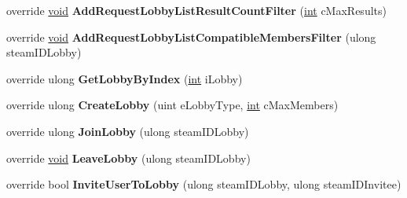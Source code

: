 \begin{DoxyCompactItemize}
\item 
\hypertarget{classValve_1_1Steamworks_1_1CSteamMatchmaking_a8fa5cee5cad857513eefb6151200ac21}{}override \hyperlink{SDL__audio_8h_a52835ae37c4bb905b903cbaf5d04b05f}{void} {\bfseries Add\+Request\+Lobby\+List\+Result\+Count\+Filter} (\hyperlink{SDL__thread_8h_a6a64f9be4433e4de6e2f2f548cf3c08e}{int} c\+Max\+Results)\label{classValve_1_1Steamworks_1_1CSteamMatchmaking_a8fa5cee5cad857513eefb6151200ac21}

\item 
\hypertarget{classValve_1_1Steamworks_1_1CSteamMatchmaking_a04ee4ec68751ead938cf98fcc8730def}{}override \hyperlink{SDL__audio_8h_a52835ae37c4bb905b903cbaf5d04b05f}{void} {\bfseries Add\+Request\+Lobby\+List\+Compatible\+Members\+Filter} (ulong steam\+I\+D\+Lobby)\label{classValve_1_1Steamworks_1_1CSteamMatchmaking_a04ee4ec68751ead938cf98fcc8730def}

\item 
\hypertarget{classValve_1_1Steamworks_1_1CSteamMatchmaking_a315830b2eb4fe823ce9c5bff328755d9}{}override ulong {\bfseries Get\+Lobby\+By\+Index} (\hyperlink{SDL__thread_8h_a6a64f9be4433e4de6e2f2f548cf3c08e}{int} i\+Lobby)\label{classValve_1_1Steamworks_1_1CSteamMatchmaking_a315830b2eb4fe823ce9c5bff328755d9}

\item 
\hypertarget{classValve_1_1Steamworks_1_1CSteamMatchmaking_abbd1161d4a0432760151c7a0fad389d6}{}override ulong {\bfseries Create\+Lobby} (uint e\+Lobby\+Type, \hyperlink{SDL__thread_8h_a6a64f9be4433e4de6e2f2f548cf3c08e}{int} c\+Max\+Members)\label{classValve_1_1Steamworks_1_1CSteamMatchmaking_abbd1161d4a0432760151c7a0fad389d6}

\item 
\hypertarget{classValve_1_1Steamworks_1_1CSteamMatchmaking_a94a4e51b76cf834559779343dea50884}{}override ulong {\bfseries Join\+Lobby} (ulong steam\+I\+D\+Lobby)\label{classValve_1_1Steamworks_1_1CSteamMatchmaking_a94a4e51b76cf834559779343dea50884}

\item 
\hypertarget{classValve_1_1Steamworks_1_1CSteamMatchmaking_ade144d76e2c6f2a018669e4c40d964e2}{}override \hyperlink{SDL__audio_8h_a52835ae37c4bb905b903cbaf5d04b05f}{void} {\bfseries Leave\+Lobby} (ulong steam\+I\+D\+Lobby)\label{classValve_1_1Steamworks_1_1CSteamMatchmaking_ade144d76e2c6f2a018669e4c40d964e2}

\item 
\hypertarget{classValve_1_1Steamworks_1_1CSteamMatchmaking_ab0bda011b5378be07fd8a8f70744d9ee}{}override bool {\bfseries Invite\+User\+To\+Lobby} (ulong steam\+I\+D\+Lobby, ulong steam\+I\+D\+Invitee)\label{classValve_1_1Steamworks_1_1CSteamMatchmaking_ab0bda011b5378be07fd8a8f70744d9ee}


\end{DoxyCompactItemize}
